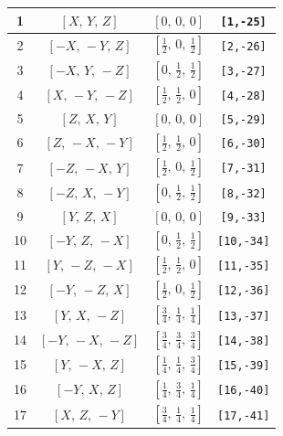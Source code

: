 \documentclass[fleqn,8pt]{jsarticle}
\begin{document}
\begin{longtable}{cccc}
1 & $\left[ X,\, Y,\, Z \right]$ & $\left[ 0,\, 0,\, 0 \right]$ & {\tt [1,-25]} \\ \hline
2 & $\left[ - X,\, - Y,\, Z \right]$ & $\left[ \frac{1}{2},\, 0,\, \frac{1}{2} \right]$ & {\tt [2,-26]} \\ \hline
3 & $\left[ - X,\, Y,\, - Z \right]$ & $\left[ 0,\, \frac{1}{2},\, \frac{1}{2} \right]$ & {\tt [3,-27]} \\ \hline
4 & $\left[ X,\, - Y,\, - Z \right]$ & $\left[ \frac{1}{2},\, \frac{1}{2},\, 0 \right]$ & {\tt [4,-28]} \\ \hline
5 & $\left[ Z,\, X,\, Y \right]$ & $\left[ 0,\, 0,\, 0 \right]$ & {\tt [5,-29]} \\ \hline
6 & $\left[ Z,\, - X,\, - Y \right]$ & $\left[ \frac{1}{2},\, \frac{1}{2},\, 0 \right]$ & {\tt [6,-30]} \\ \hline
7 & $\left[ - Z,\, - X,\, Y \right]$ & $\left[ \frac{1}{2},\, 0,\, \frac{1}{2} \right]$ & {\tt [7,-31]} \\ \hline
8 & $\left[ - Z,\, X,\, - Y \right]$ & $\left[ 0,\, \frac{1}{2},\, \frac{1}{2} \right]$ & {\tt [8,-32]} \\ \hline
9 & $\left[ Y,\, Z,\, X \right]$ & $\left[ 0,\, 0,\, 0 \right]$ & {\tt [9,-33]} \\ \hline
10 & $\left[ - Y,\, Z,\, - X \right]$ & $\left[ 0,\, \frac{1}{2},\, \frac{1}{2} \right]$ & {\tt [10,-34]} \\ \hline
11 & $\left[ Y,\, - Z,\, - X \right]$ & $\left[ \frac{1}{2},\, \frac{1}{2},\, 0 \right]$ & {\tt [11,-35]} \\ \hline
12 & $\left[ - Y,\, - Z,\, X \right]$ & $\left[ \frac{1}{2},\, 0,\, \frac{1}{2} \right]$ & {\tt [12,-36]} \\ \hline
13 & $\left[ Y,\, X,\, - Z \right]$ & $\left[ \frac{3}{4},\, \frac{1}{4},\, \frac{1}{4} \right]$ & {\tt [13,-37]} \\ \hline
14 & $\left[ - Y,\, - X,\, - Z \right]$ & $\left[ \frac{3}{4},\, \frac{3}{4},\, \frac{3}{4} \right]$ & {\tt [14,-38]} \\ \hline
15 & $\left[ Y,\, - X,\, Z \right]$ & $\left[ \frac{1}{4},\, \frac{1}{4},\, \frac{3}{4} \right]$ & {\tt [15,-39]} \\ \hline
16 & $\left[ - Y,\, X,\, Z \right]$ & $\left[ \frac{1}{4},\, \frac{3}{4},\, \frac{1}{4} \right]$ & {\tt [16,-40]} \\ \hline
17 & $\left[ X,\, Z,\, - Y \right]$ & $\left[ \frac{3}{4},\, \frac{1}{4},\, \frac{1}{4} \right]$ & {\tt [17,-41]} \\ \hline

\end{longtable}
\end{document}
